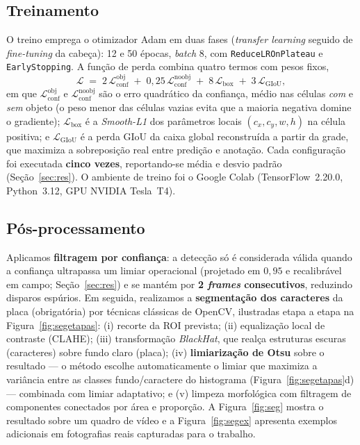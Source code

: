 \documentclass[conference]{IEEEtran}
\begin{document}
\subsection{Treinamento}
O treino emprega o otimizador Adam em duas fases (\emph{transfer learning} seguido
de \emph{fine-tuning} da cabeça): 12 e 50 épocas, \emph{batch} 8, com
\texttt{ReduceLROnPlateau} e \texttt{EarlyStopping}. A função de perda combina
quatro termos com pesos fixos,
\begin{equation}
\mathcal{L} \;=\; 2\,\mathcal{L}_{\text{conf}}^{\text{obj}}
\;+\; 0{,}25\,\mathcal{L}_{\text{conf}}^{\text{noobj}}
\;+\; 8\,\mathcal{L}_{\text{box}}
\;+\; 3\,\mathcal{L}_{\text{GIoU}},
\label{eq:loss}
\end{equation}
em que $\mathcal{L}_{\text{conf}}^{\text{obj}}$ e
$\mathcal{L}_{\text{conf}}^{\text{noobj}}$ são o erro quadrático da confiança,
médio nas células \emph{com} e \emph{sem} objeto (o peso menor das células
vazias evita que a maioria negativa domine o gradiente);
$\mathcal{L}_{\text{box}}$ é a \emph{Smooth-L1} dos parâmetros locais
$(c_x, c_y, w, h)$ na célula positiva; e $\mathcal{L}_{\text{GIoU}}$ é a perda
GIoU da caixa global reconstruída a partir da grade, que maximiza a
sobreposição real entre predição e anotação. Cada configuração foi executada
\textbf{cinco vezes}, reportando-se média e desvio padrão (Seção~\ref{sec:res}). O
ambiente de treino foi o Google Colab (TensorFlow~2.20.0, Python~3.12, GPU
NVIDIA Tesla~T4).

\subsection{Pós-processamento}
Aplicamos \textbf{filtragem por confiança}: a detecção só é considerada válida
quando a confiança ultrapassa um limiar operacional (projetado em $0{,}95$ e
recalibrável em campo; Seção~\ref{sec:res}) e se mantém por
\textbf{2 \emph{frames} consecutivos}, reduzindo disparos espúrios. Em seguida,
realizamos a \textbf{segmentação dos caracteres} da placa (obrigatória) por
técnicas clássicas de OpenCV, ilustradas etapa a etapa na
Figura~\ref{fig:segetapas}: (i) recorte da ROI prevista; (ii) equalização local
de contraste (CLAHE); (iii) transformação \emph{BlackHat}, que realça
estruturas escuras (caracteres) sobre fundo claro (placa); (iv)
\textbf{limiarização de Otsu} sobre o resultado --- o método escolhe
automaticamente o limiar que maximiza a variância entre as classes
fundo/caractere do histograma (Figura~\ref{fig:segetapas}d) --- combinada com
limiar adaptativo; e (v) limpeza morfológica com filtragem de componentes
conectados por área e proporção. A Figura~\ref{fig:seg} mostra o resultado
sobre um quadro de vídeo e a Figura~\ref{fig:segex} apresenta exemplos
adicionais em fotografias reais capturadas para o trabalho.
\end{document}
